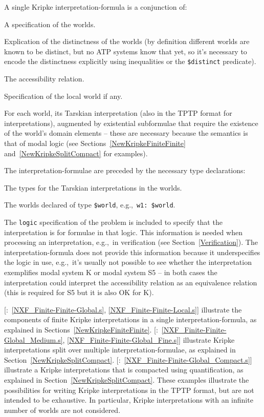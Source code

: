 \documentclass{easychair}
\newcommand{\smalltt}[1]{\small \texttt{#1}}
\newcommand{\example}{{\scriptsize \faFile[regular]}}
\newenvironment{packed_itemize}{
\vspace*{-0.3em}
\begin{itemize}
\setlength{\partopsep}{0pt}
\setlength{\itemsep}{1pt}
\setlength{\parskip}{0pt}
\setlength{\parsep}{0pt}
}{\end{itemize}}
\begin{document}
A single Kripke interpretation-formula is a conjunction of:
\begin{packed_itemize}
\item A specification of the worlds.
\item Explication of the distinctness of the worlds (by definition different worlds are known to
      be distinct, but no ATP systems know that yet, so it's necessary to encode the
      distinctness explicitly using inequalities or the \smalltt{\$distinct} predicate).
\item The accessibility relation.
\item Specification of the local world if any.
\item For each world, its Tarskian interpretation (also in the TPTP format for interpretations),
      augmented by existential subformulae that require the existence of the world's domain 
      elements -- these are necessary because the semantics is that of modal logic (see
      Sections~\ref{NewKripkeFiniteFinite} and~\ref{NewKripkeSplitCompact} for examples).
\end{packed_itemize}
The interpretation-formulae are preceded by the necessary type declarations:
\begin{packed_itemize}
\item The types for the Tarskian interpretations in the worlds.
\item The worlds declared of type \smalltt{\$world}, e.g.,~\smalltt{w1: \$world}.
\end{packed_itemize}

The \smalltt{logic} specification of the problem is included to specify that the interpretation is
for formulae in that logic.
This information is needed when processing an interpretation, e.g.,~in verification (see 
Section~\ref{Verification}). 
The interpretation-formula does not provide this information because it underspecifies the 
logic in use, e.g.,~it's usually not possible to see whether the interpretation exemplifies modal 
system K or modal system S5 -- in both cases the interpretation could interpret the accessibility 
relation as an equivalence relation (this is required for S5 but it is also OK for K).

[\example{}:~\ref{NXF_Finite-Finite-Global.s}, \ref{NXF_Finite-Finite-Local.s}] illustrate the 
components of finite Kripke interpretations in a single interpretation-formula, as explained in 
Sections~\ref{NewKripkeFiniteFinite}.
[\example{}:~\ref{NXF_Finite-Finite-Global_Medium.s},
\ref{NXF_Finite-Finite-Global_Fine.s}] illustrate Kripke interpretations split 
over multiple interpretation-formulae, as explained in Section~\ref{NewKripkeSplitCompact}.
[\example{}:~\ref{NXF_Finite-Finite-Global_Compact.s}] illustrate
a Kripke interpretations that is compacted using quantification, as explained in 
Section~\ref{NewKripkeSplitCompact}.
These examples illustrate the possibilities for writing Kripke interpretations in the TPTP format,
but are not intended to be exhaustive.
In particular, Kripke interpretations with an infinite number of worlds are not considered.
\end{document}
